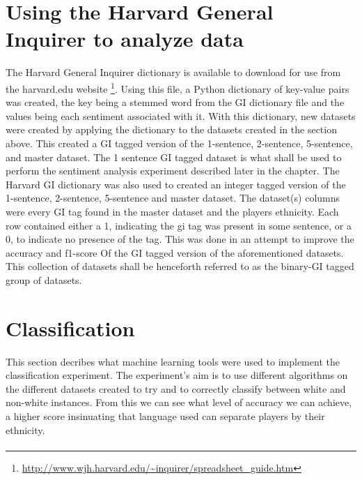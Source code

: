 \documentclass[oneside,12pt]{Classes/RoboticsLaTeX}
\begin{document}
\section{Using the Harvard General Inquirer to analyze data}
\label{sec:GI_dict}
The Harvard General Inquirer dictionary is available to download for use from the harvard.edu website \footnote{\url{http://www.wjh.harvard.edu/~inquirer/spreadsheet_guide.htm}}. Using this file, a Python
dictionary of key-value pairs was created, the key being a stemmed word from the GI dictionary file and the values being each sentiment associated with it. With this dictionary, new datasets were created by 
applying the dictionary to the datasets created in the section above. This created a GI tagged version of the 1-sentence, 2-sentence, 5-sentence, and master dataset. The 1 sentence GI tagged 
dataset is what shall be used to perform the sentiment analysis experiment described later in the chapter.
The Harvard GI dictionary was also used to created an integer tagged version of the 1-sentence, 2-sentence, 5-sentence and master dataset. The dataset(s) columns were every GI tag found in the master dataset and 
the players ethnicity. Each row contained either a 1, indicating the gi tag was present in some sentence, or a 0, to indicate no presence of the tag. This was done in an attempt to improve the accuracy and f1-score Of
the GI tagged version of the aforementioned datasets. This collection of datasets shall be henceforth referred to as the binary-GI tagged group of datasets.

\section{Classification}
\label{sec:sci-kit_label}
This section decribes what machine learning tools were used to implement the classification experiment. The experiment's aim is to use different algorithms on the different datasets created to try and to
correctly classify between white and non-white instances. From this we can see what level of accuracy we can achieve, a higher score insinuating that language used can separate players by their ethnicity.
\paragraph{}

\end{document}
